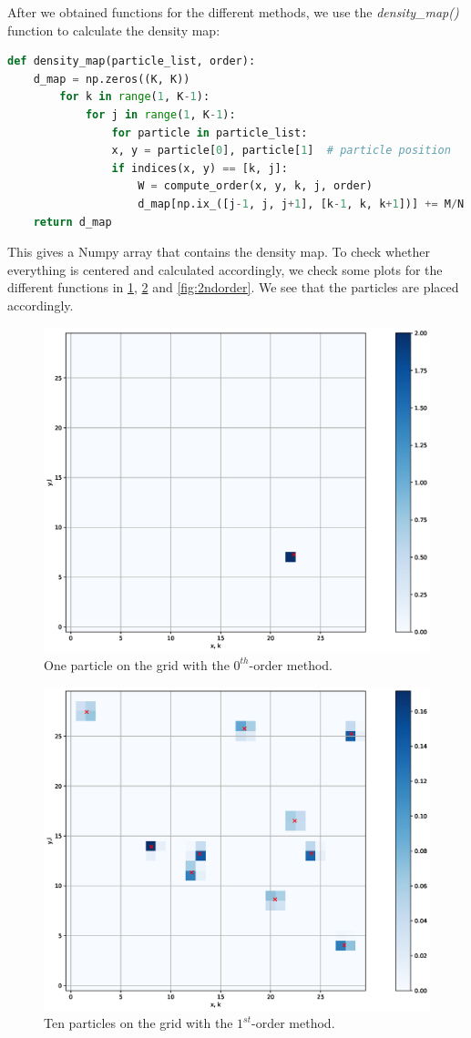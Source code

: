 \documentclass{scrartcl}
\begin{document}
After we obtained functions for the different methods, we use the \textit{density\_map()} function to calculate the density map:
\begin{lstlisting}[title=Function to calculate the 2nd order., language=Python, frame=single]
def density_map(particle_list, order):
	d_map = np.zeros((K, K))
		for k in range(1, K-1):
			for j in range(1, K-1):
				for particle in particle_list:
				x, y = particle[0], particle[1]  # particle position
				if indices(x, y) == [k, j]:
					W = compute_order(x, y, k, j, order)
					d_map[np.ix_([j-1, j, j+1], [k-1, k, k+1])] += M/N * W
	return d_map
\end{lstlisting}
This gives a Numpy array that contains the density map. To check whether everything is centered and calculated accordingly, we check some plots for the different functions in \ref{fig:0thorder}, \ref{fig:1storder} and \ref{fig:2ndorder}.
We see that the particles are placed accordingly.
\begin{figure}[h]
	\centering
	\includegraphics[width=0.9\linewidth]{Plots/0th_order.eps}
	\caption{One particle on the grid with the \(0^{th}\)-order method.}
	\label{fig:0thorder}
\end{figure}
\begin{figure}[h]
	\centering
	\includegraphics[width=0.9\linewidth]{Plots/1st_order.eps}
	\caption{Ten particles on the grid with the \(1^{st}\)-order method.}
	\label{fig:1storder}
\end{figure}
\end{document}
